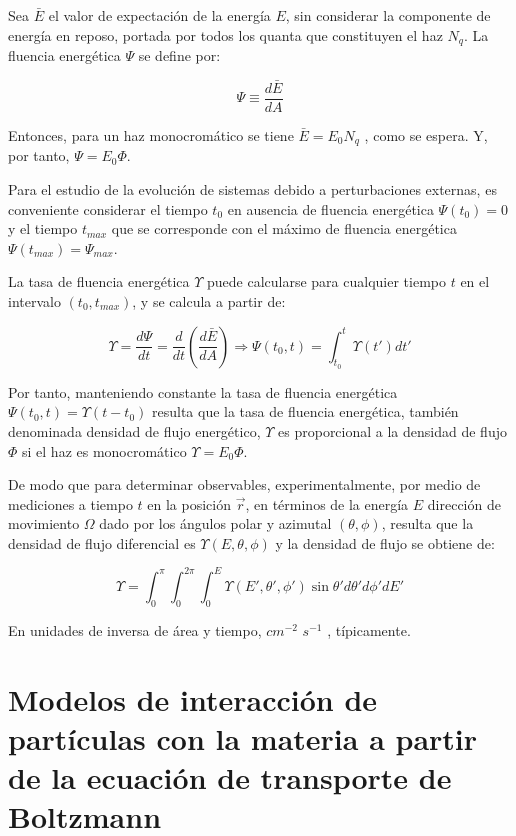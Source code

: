 Sea $\bar{E}$ el valor de expectación de la energía $E$, sin considerar la componente de energía en reposo, portada por todos los quanta que constituyen el haz $N_q$. La fluencia energética $\Psi$ se define por:

\begin{equation}
 \Psi \equiv \frac{d\bar{E}}{dA}
\end{equation}

Entonces, para un haz monocromático se tiene $\bar{E} = E_{0}N_{q}$ , como se espera. Y, por tanto, $\Psi = E_{0}\Phi$.

Para el estudio de la evolución de sistemas debido a perturbaciones externas, es conveniente considerar el tiempo $t_0$ en ausencia de fluencia energética $\Psi(t_0) = 0$ y el tiempo $t_{max}$ que se corresponde con el máximo de fluencia energética $\Psi(t_{max}) = \Psi_{max}$.

La tasa de fluencia energética $\Upsilon$ puede calcularse para cualquier tiempo $t$ en el intervalo $(t_0 ,t_{max})$, y se calcula a partir de:

\begin{equation}
 \Upsilon = \frac{d\Psi}{dt} = \frac{d}{dt} \left(\frac{d\bar{E}}{dA}\right) \Longrightarrow \Psi(t_0,t) = \int_{t_{0}}^{t}{\Upsilon(t')dt'}
\end{equation}

Por tanto, manteniendo constante la tasa de fluencia energética $\Psi(t_0 ,t) = \Upsilon(t - t_0 )$ resulta que la tasa de fluencia energética, también denominada densidad de flujo energético, $\Upsilon$ es proporcional a la densidad de flujo $\Phi$ si el haz es monocromático $\Upsilon = E_0 \Phi$.

De modo que para determinar observables, experimentalmente, por medio de mediciones a tiempo $t$ en la posición $\vec{r}$, en términos de la energía $E$ dirección de movimiento $\Omega$ dado por los ángulos polar y azimutal $(\theta, \phi)$, resulta que la densidad de flujo diferencial es $\Upsilon(E, \theta, \phi)$ y la densidad de flujo se obtiene de:

\begin{equation}
 \Upsilon = \int_{0}^{\pi}{\int_{0}^{2\pi}{\int_{0}^{E}{\Upsilon(E', \theta', \phi')\sin{\theta'}d\theta'}d\phi'}dE'}
\end{equation}

En unidades de inversa de área y tiempo, $cm^{-2}$ $s^{-1}$ , típicamente.

\section{Modelos de interacci\'on de part\'iculas con la materia a partir de la ecuaci\'on de transporte de Boltzmann}

